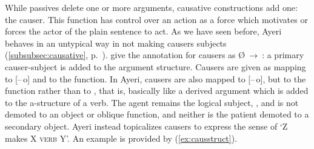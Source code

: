 While passives delete one or more arguments, causative constructions add one:
the causer. This function has control over an action as a force which motivates
or forces the actor of the plain sentence to act. As we have seen before, Ayeri
behaves in an untypical way in not making causers subjects
(\autoref{subsubsec:causative}, p.~\pageref{subsubsec:causative}).
\citet[342]{bresnan2016} give the annotation for causers as
Ø~→~\thetaroof{}: a primary causer-subject is added to the argument
structure. Causers are given as mapping to [–\,o] and to the \Subj{} function.
In Ayeri, causers are also mapped to [–\,o], but to the \Oblique{} function
rather than to \Subj{}, that is, basically like a derived argument which is
added to the a-structure of a verb. The agent remains the logical subject,
\thetaroof{}, and is not demoted to an object or oblique function, and neither
is the patient demoted to a secondary object. Ayeri instead topicalizes causers
to express the sense of `Z makes X \textsc{verb} Y'. An example is provided
by (\ref{ex:causstruct}).

